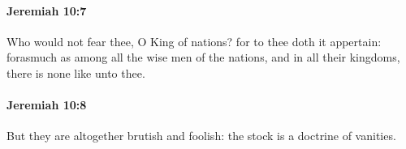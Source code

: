 		\paragraph{Jeremiah 10:7} %
			\label{JEREMIAH-10-7}

			Who would not fear thee, O King of nations? for to thee doth it appertain: forasmuch as among all the wise men of the nations, and in all their kingdoms, there is none like unto thee.


		\paragraph{Jeremiah 10:8} %
			\label{JEREMIAH-10-8}

			But they are altogether brutish and foolish: the stock is a doctrine of vanities.


